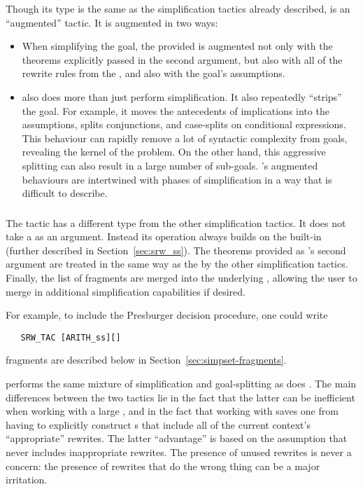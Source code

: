 {Though its type is the same as the simplification tactics already
described,  is an ``augmented'' tactic.  It is augmented
in two ways:
\begin{itemize}
\item When simplifying the goal, the provided \simpset{} is augmented
  not only with the theorems explicitly passed in the second argument,
  but also with all of the rewrite rules from the , and
  also with the goal's assumptions.
%
\item {} also does more than just perform simplification.
  It also repeatedly ``strips'' the goal.  For example, it moves the
  antecedents of implications into the assumptions, splits
  conjunctions, and case-splits on conditional expressions.  This
  behaviour can rapidly remove a lot of syntactic complexity from
  goals, revealing the kernel of the problem.  On the other hand, this
  aggressive splitting can also result in a large number of
  sub-goals.  's augmented behaviours are intertwined with
  phases of simplification in a way that is difficult to describe.
\end{itemize}

\subsubsection{}

The tactic  has a different type from the other
simplification tactics.  It does not take a \simpset{} as an argument.
Instead its operation always builds on the built-in \simpset{}
 (further described in Section~\ref{sec:srw_ss}).  The
theorems provided as 's second argument are treated in
the same way as the by the other simplification tactics.  Finally, the
list of \simpset{} fragments are merged into the underlying
\simpset{}, allowing the user to merge in additional simplification
capabilities if desired.

For example, to include the Presburger decision procedure, one could
write
\begin{hol}
\begin{verbatim}
   SRW_TAC [ARITH_ss][]
\end{verbatim}
\end{hol}
\Simpset{} fragments are described below in
Section~\ref{sec:simpset-fragments}.

 performs the same mixture of simplification and
goal-splitting as does .  The main differences between the
two tactics lie in the fact that the latter can be inefficient when
working with a large , and in the fact that working with
 saves one from having to explicitly construct
\simpset{}s that include all of the current context's ``appropriate''
rewrites.  The latter ``advantage'' is based on the assumption that
 never includes inappropriate rewrites.  The presence
of unused rewrites is never a concern: the presence of rewrites that
do the wrong thing can be a major irritation.

}
